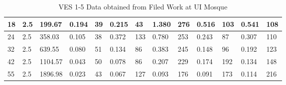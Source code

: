 \documentclass[12pt,a4paper]{report}
\begin{document}
\begin{itemize}
\begin{table}[H]
\begin{adjustbox}{max width=\textwidth}
\begin{tabular}{|p{2.5cm}|p{2.5cm}|p{2.5cm}|p{1.5cm}|p{1.8cm}|p{1.5cm}|p{1.8cm}|p{1.5cm}|p{1.8cm}|p{1.5cm}|p{1.8cm}|p{1.5cm}|p{1.8cm}|}
        18 & 2.5 & 199.67 & 0.194 & 39 & 0.215 & 43 & 1.380 & 276 & 0.516 & 103 & 0.541 & 108 \\ \hline
        24 & 2.5 & 358.03 & 0.105 & 38 & 0.372 & 133 & 0.780 & 253 & 0.243 & 87 & 0.307 & 110 \\ \hline
        32 & 2.5 & 639.55 & 0.080 & 51 & 0.134 & 86 & 0.383 & 245 & 0.148 & 96 & 0.192 & 123 \\ \hline
        42 & 2.5 & 1104.57 & 0.043 & 50 & 0.078 & 86 & 0.207 & 229 & 0.174 & 192 & 0.134 & 148 \\ \hline
        55 & 2.5 & 1896.98 & 0.023 & 43 & 0.067 & 127 & 0.093 & 176 & 0.091 & 173 & 0.114 & 216 \\ \hline
        \end{tabular}
        \end{adjustbox}
        \caption{VES 1-5 Data obtained from Filed Work at UI Mosque}
        \label{tab:ui_ves-1-5}
    \end{table}


\end{itemize}
\end{document}
